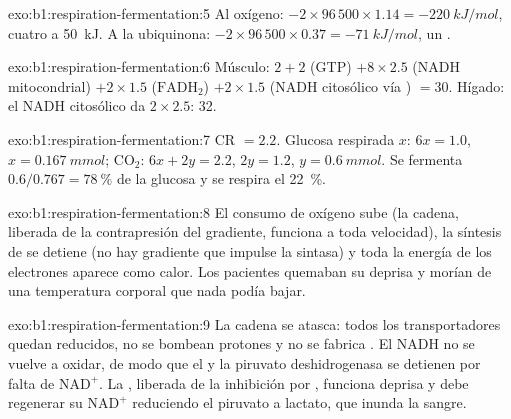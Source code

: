 \begin{solution}{exo:b1:respiration-fermentation:5}
Al oxígeno: $-2\times 96\,500\times 1.14 = \qty{-220}{kJ/mol}$, cuatro  a
\qty{50}{kJ}. A la ubiquinona: $-2\times 96\,500\times 0.37 =
\qty{-71}{kJ/mol}$, un .
\end{solution}

\begin{solution}{exo:b1:respiration-fermentation:6}
Músculo: $2 + 2$ (GTP) $+ 8\times 2.5$ (NADH mitocondrial) $+ 2\times
1.5$ ($\mathrm{FADH_2}$) $+ 2\times 1.5$ (NADH citosólico vía ) $=
30$. Hígado: el NADH citosólico da $2\times 2.5$: 32.
\end{solution}

\begin{solution}{exo:b1:respiration-fermentation:7}
CR $= 2.2$. Glucosa respirada $x$: $6x = 1.0$, $x = \qty{0.167}{mmol}$;
$\mathrm{CO_2}$: $6x + 2y = 2.2$, $2y = 1.2$, $y = \qty{0.6}{mmol}$. Se
fermenta $0.6/0.767 = \qty{78}{\%}$ de la glucosa y se respira el
\qty{22}{\%}.
\end{solution}

\begin{solution}{exo:b1:respiration-fermentation:8}
El consumo de oxígeno sube (la cadena, liberada de la contrapresión del
gradiente, funciona a toda velocidad), la síntesis de  se detiene (no hay
gradiente que impulse la sintasa) y toda la energía de los electrones
aparece como calor. Los pacientes quemaban su  deprisa y morían de una
temperatura corporal que nada podía bajar.
\end{solution}

\begin{solution}{exo:b1:respiration-fermentation:9}
La cadena se atasca: todos los transportadores quedan reducidos, no se
bombean protones y no se fabrica . El NADH no se vuelve a oxidar, de modo
que el  y la piruvato deshidrogenasa se detienen por falta de
$\mathrm{NAD^+}$. La , liberada de la inhibición por , funciona
deprisa y debe regenerar su $\mathrm{NAD^+}$ reduciendo el piruvato a
lactato, que inunda la sangre.
\end{solution}

